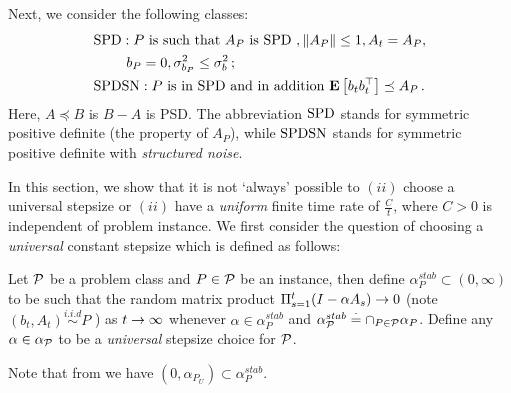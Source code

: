 Next, we consider the following classes:
\begin{align*}
\MoveEqLeft  \SPD: P \text{ is such that } A_P \text{ is SPD }, \norm{A_P}\le 1, A_t = A_P, \\
		 &\,\,b_P=0, \sigma_{b_P}^2 \le \sigma_b^2\,;\\
\MoveEqLeft \SPDSN: P \text{ is in } \SPD \text{ and in addition } \EE{ b_t b_t^\top } \preceq A_P\,.
\end{align*}
Here, $A\preceq B$ is $B-A$ is PSD. The abbreviation $\SPD$ stands for symmetric positive definite (the property of $A_P$), while $\SPDSN$ stands for symmetric positive definite with \emph{structured noise}.

In this section, we show that it is not `always' possible to $(ii)$ choose a universal stepsize or $(ii)$ have a \emph{uniform} finite time rate of $\frac{C}{t}$, where $C>0$ is independent of problem instance.
We first consider the question of choosing a \emph{universal} constant stepsize which is defined as follows:
\begin{definition} Let $\P$ be a problem class and $P\in\P$ be an instance, then define $\alpha^{stab}_{P}\subset (0,\infty)$ to be such that the random matrix product $\Pi_{s=1}^t (I-\alpha A_s)\ra 0$ (note $(b_t,A_t)\overset{i.i.d}{\sim} P$ ) as $t\ra\infty$ whenever $\alpha\in \alpha^{stab}_P$ and $\alpha^{stab}_{\P}\eqdef\cap_{P\in \P}\alpha_{P}$. Define any $\alpha\in\alpha_{\P}$ to be a \emph{universal} stepsize choice for $\P$.
\end{definition}
Note that from  we have $(0,\alpha_{P_U})\subset \alpha^{stab}_{P}$. 

